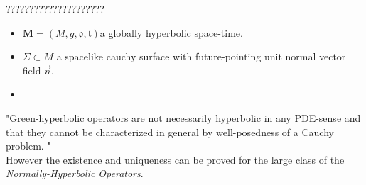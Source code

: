 \documentclass[Main]{subfiles}
\begin{document}
	?????????????????????
	\begin{proposition}
		\begin{hypothesis}
			\begin{itemize}
				\item $\mathbf{M} = (M,g,\mathfrak{o},\mathfrak{t}) $a globally hyperbolic space-time.
				\item $\Sigma \subset M$ a spacelike cauchy surface with future-pointing unit normal vector field $\vec{n}$.
				\item 
			\end{itemize}
		\end{hypothesis}
	\begin{thesis}

	\end{thesis}
	\end{proposition}
	\begin{observation}
	"Green-hyperbolic operators are not necessarily hyperbolic in any PDE-sense and that they cannot be characterized in general by well-posedness of a Cauchy problem.	" \cite{Terlaky2010} \cite{Bar2010}
	\\
	However the existence and uniqueness can be proved for the large class of the \emph{Normally-Hyperbolic Operators}.
	
	\end{observation}

				
\end{document}
